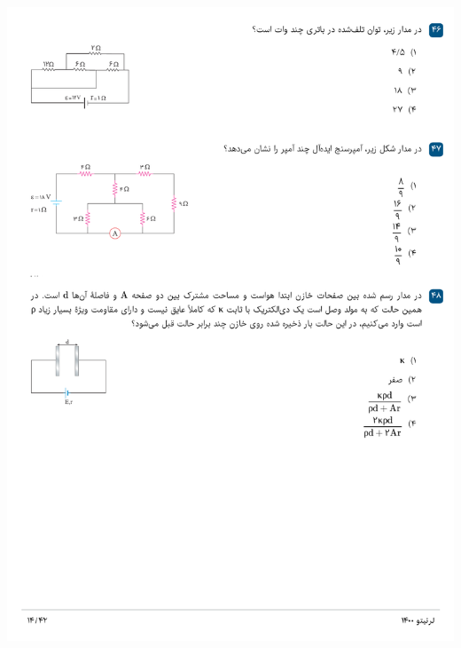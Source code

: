 \documentclass{book}
\begin{document}
\includegraphics[width=\textwidth]{"pages/14"}
\end{document}
